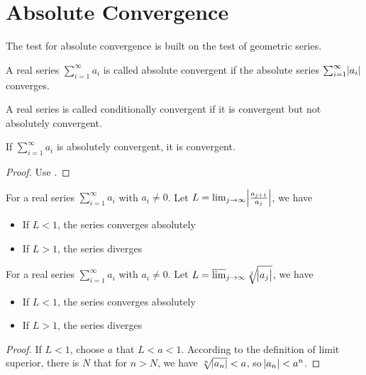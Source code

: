 
\section{Absolute Convergence}

The test for absolute convergence is built on the test of geometric series.

\begin{definition}
    A real series $\sum_{i=1}^\infty a_i$ is called absolute convergent if the absolute series $\sum_{i=1}^\infty \abs{a_i}$ converges.
\end{definition}

\begin{definition}
    A real series is called conditionally convergent if it is convergent but not absolutely convergent.
\end{definition}

\begin{theorem}
    If $\sum_{i=1}^\infty a_i$ is absolutely convergent, it is convergent.
\end{theorem}
\begin{proof}
    Use .
\end{proof}


\begin{theorem}
    For a real series $\sum_{i=1}^\infty a_i$ with $a_i \neq 0$. Let $L = \lim_{j \rightarrow \infty} \abs{\frac{a_{j+1}}{a_j}}$, we have
    \begin{itemize}
        \item If $L < 1$, the series converges absolutely
        \item If $L > 1$, the series diverges
    \end{itemize}
\end{theorem}

\begin{theorem}
    For a real series $\sum_{i=1}^\infty a_i$ with $a_i \neq 0$. Let $L = \varlimsup_{j \rightarrow \infty}  \sqrt[j]{\abs{a_j}}$, we have
    \begin{itemize}
        \item If $L < 1$, the series converges absolutely
        \item If $L > 1$, the series diverges
    \end{itemize}
\end{theorem}
\begin{proof}
    If $L < 1$, choose $a$ that $L < a < 1$. According to the definition of limit superior, there is $N$ that for $n > N$, we have $\sqrt[n]{\abs{a_n}} < a$, so $\abs{a_n} < a^n$.
\end{proof}

